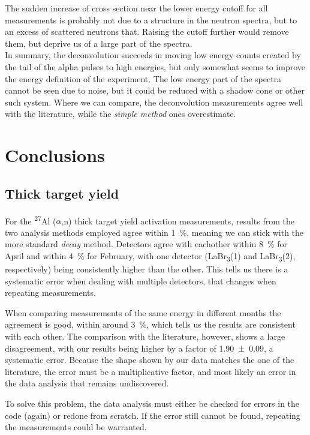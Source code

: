 \documentclass[a4paper,12pt]{report}
\newcommand{\an}{($\alpha$,n) }
\newcommand{\Aliso}{\textsuperscript{27}Al }
\begin{document}
The sudden increase of cross section near the lower energy cutoff for all measurements is probably not due to a structure in the neutron spectra, but to an excess of scattered neutrons that.
Raising the cutoff further would remove them, but deprive us of a large part of the spectra.
\\

In summary, the deconvolution succeeds in moving low energy counts created by the tail of the alpha pulses to high energies, but only somewhat seems to improve the energy definition of the experiment.
The low energy part of the spectra cannot be seen due to noise, but it could be reduced with a shadow cone or other such system.
Where we can compare, the deconvolution measurements agree well with the literature, while the \textit{simple method} ones overestimate.

\chapter{Conclusions}
\section{Thick target yield}
For the \Aliso\an thick target yield activation measurements, results from the two analysis methods employed agree within \qty{1}{\percent}, meaning we can stick with the more standard \textit{decay} method.
Detectors agree with eachother within \qty{8}{\percent} for April and within \qty{4}{\percent} for February, with one detector (LaBr\textsubscript{3}(1) and LaBr\textsubscript{3}(2), respectively) being consistently higher than the other.
This tells us there is a systematic error when dealing with multiple detectors, that changes when repeating measurements.

When comparing measurements of the same energy in different months the agreement is good, within around \qty{3}{\percent}, which tells us the results are consistent with each other.
The comparison with the literature, however, shows a large disagreement, with our results being higher by a factor of \num{1.90(9)}, a systematic error.
Because the shape shown by our data matches the one of the literature, the error must be a multiplicative factor, and most likely an error in the data analysis that remains undiscovered.

To solve this problem, the data analysis must either be checked for errors in the code (again) or redone from scratch.
If the error still cannot be found, repeating the measurements could be warranted.
\\
\end{document}
